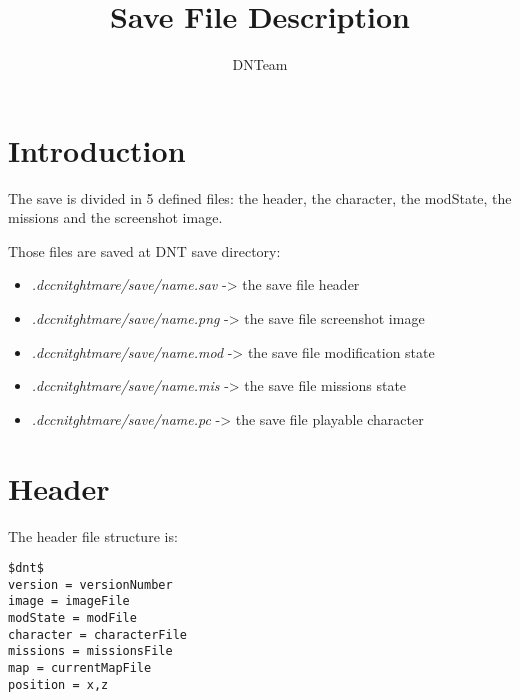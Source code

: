 \documentclass[letterpaper,12pt]{article}
\begin{document}
\title{Save File Description}

\author{
DNTeam
}

\maketitle


\newpage

\tableofcontents

\newpage

\section{Introduction}

The save is divided in 5 defined files: the header, the character, the
modState, the missions and the screenshot image.

Those files are saved at DNT save directory:

\begin{itemize}
\item{{\it .dccnitghtmare/save/name.sav} -> the save file header }
\item{{\it .dccnitghtmare/save/name.png} -> the save file screenshot image}
\item{{\it .dccnitghtmare/save/name.mod} -> the save file modification state}
\item{{\it .dccnitghtmare/save/name.mis} -> the save file missions state}
\item{{\it .dccnitghtmare/save/name.pc} -> the save file playable character}
\end{itemize}

\section{Header}

The header file structure is:

\begin{verbatim}
$dnt$
version = versionNumber
image = imageFile
modState = modFile
character = characterFile
missions = missionsFile
map = currentMapFile
position = x,z
\end{verbatim}
\end{document}
